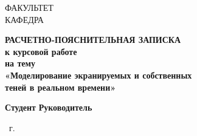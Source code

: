 \begin{titlepage}
	\noindent
	\begin{minipage}{\textwidth}
		\fontsize{12pt}{24pt}\selectfont
		ФАКУЛЬТЕТ \underline{}\\
		КАФЕДРА \underline{}
	\end{minipage}

	\vspace{2.0cm}

	\begin{center}
		\LARGE\textbf{РАСЧЕТНО-ПОЯСНИТЕЛЬНАЯ ЗАПИСКА}\\
		\LARGE\textbf{к курсовой работе}\\
		\LARGE\textbf{на тему}\\
		\LARGE\textbf{«Моделирование экранируемых и собственных}\\
		\LARGE\textbf{теней в реальном времени»}
	\end{center}

	\vspace{4.0cm}

	\noindent
	\begin{minipage}{\textwidth}
		\fontsize{12pt}{24pt}\selectfont
		\textbf{Студент} \hfill \underline{}\newline\newline
		\textbf{Руководитель} \hfill \underline{}\newline\newline
	\end{minipage}

	\begin{center}
		\vfill
		\the\year~г.
	\end{center}

	\restoregeometry
\end{titlepage}